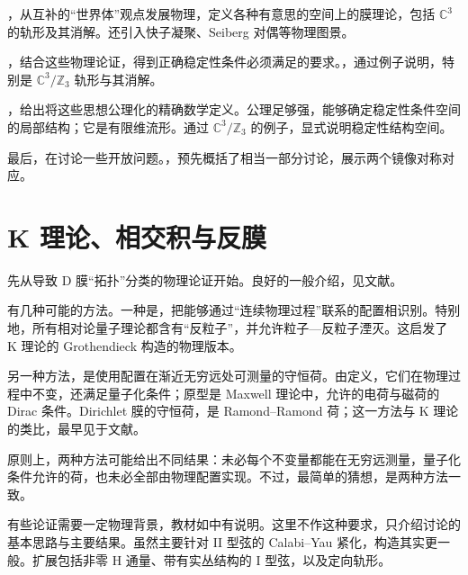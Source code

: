 ，从互补的“世界体”观点发展物理，定义各种有意思的空间上的膜理论，包括 $\mathbb{C}^3$ 的轨形及其消解。还引入快子凝聚、Seiberg 对偶等物理图景。

，结合这些物理论证，得到正确稳定性条件必须满足的要求。，通过例子说明，特别是 $\mathbb{C}^3/\mathbb{Z}_3$ 轨形与其消解。

，给出将这些思想公理化的精确数学定义。公理足够强，能够确定稳定性条件空间的局部结构；它是有限维流形。通过 $\mathbb{C}^3/\mathbb{Z}_3$ 的例子，显式说明稳定性结构空间。

最后，在讨论一些开放问题。，预先概括了相当一部分讨论，展示两个镜像对称对应。

\section{K 理论、相交积与反膜}\label{sec:5.1}

先从导致 D 膜“拓扑”分类的物理论证开始。良好的一般介绍，见文献。

有几种可能的方法。一种是，把能够通过“连续物理过程”联系的配置相识别。特别地，所有相对论量子理论都含有“反粒子”，并允许粒子—反粒子湮灭。这启发了 K 理论的 Grothendieck 构造的物理版本。

另一种方法，是使用配置在渐近无穷远处可测量的守恒荷。由定义，它们在物理过程中不变，还满足量子化条件；原型是 Maxwell 理论中，允许的电荷与磁荷的 Dirac 条件。Dirichlet 膜的守恒荷，是 Ramond--Ramond 荷；这一方法与 K 理论的类比，最早见于文献。

原则上，两种方法可能给出不同结果：未必每个不变量都能在无穷远测量，量子化条件允许的荷，也未必全部由物理配置实现。不过，最简单的猜想，是两种方法一致。

有些论证需要一定物理背景，教材如中有说明。这里不作这种要求，只介绍讨论的基本思路与主要结果。虽然主要针对 II 型弦的 Calabi--Yau 紧化，构造其实更一般。扩展包括非零 H 通量、带有实丛结构的 I 型弦，以及定向轨形。

